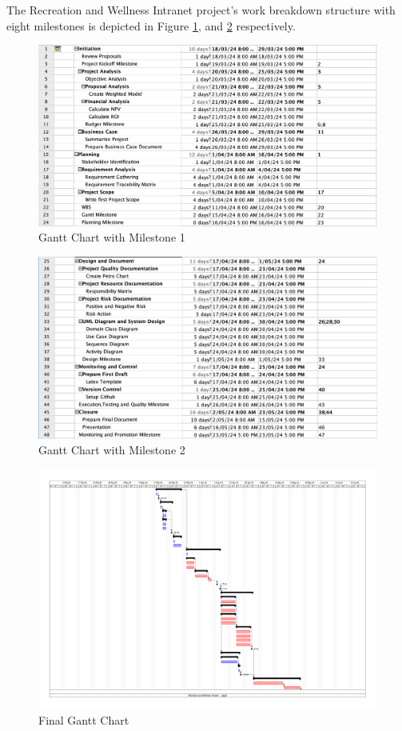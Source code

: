 The Recreation and Wellness Intranet project's work breakdown structure with eight milestones is depicted in Figure \ref{fig:gnt3}, and \ref{fig:gnt4} respectively.

\begin{figure}[ht]
    \includegraphics[width=\textwidth]{images/gantt_fill_1.png}
    \caption{Gantt Chart with Milestone 1}
    \label{fig:gnt3}
\end{figure}

\begin{figure}[ht]
    \includegraphics[width=\textwidth]{images/gantt_fill_2.png}
    \caption{Gantt Chart with Milestone 2}
    \label{fig:gnt4}
\end{figure}

\begin{figure}[ht]
    \includegraphics[width=\textwidth]{images/gantt_chart.png}
    \caption{Final Gantt Chart}
    \label{fig:gnt_chart}
\end{figure}

